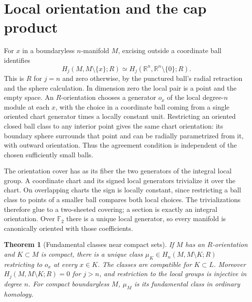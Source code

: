 \documentclass[11pt,oneside,openany]{book}
\theoremstyle{plain}
\newtheorem{theorem}{Theorem}[chapter]
\theoremstyle{definition}
\theoremstyle{remark}
\begin{document}
\section{Local orientation and the cap product}\label{p202:T29}

For \(x\) in a boundaryless \(n\)-manifold \(M\), excising outside
a coordinate ball identifies
\[
 H_j(M,M\setminus\{x\};R)
  \simeq H_j(\mathbb R^n,\mathbb R^n\setminus\{0\};R).
\]
This is \(R\) for \(j=n\) and zero otherwise, by the punctured
ball's radial retraction and the sphere calculation. In dimension
zero the local pair is a point and the empty space.
An \(R\)-orientation chooses a generator \(o_x\) of the local
degree-\(n\) module at each \(x\), with the choice in a coordinate
ball coming from a single oriented chart generator times a
locally constant unit. Restricting an oriented closed ball class
to any interior point gives the same chart orientation: its
boundary sphere surrounds that point and can be radially
parametrized from it, with outward orientation. Thus the
agreement condition is independent of the chosen sufficiently
small balls.

The orientation cover has as its fiber the two generators of the
integral local group. A coordinate chart and its signed local
generators trivialize it over the chart. On overlapping charts
the sign is locally constant, since restricting a ball class to
points of a smaller ball compares both local choices. The
trivializations therefore glue to a two-sheeted covering; a
section is exactly an integral orientation. Over \(\mathbb F_2\)
there is a unique local generator, so every manifold is
canonically oriented with those coefficients.

\begin{theorem}[Fundamental classes near compact sets]\label{thm:p202-compact-orientation}
If \(M\) has an \(R\)-orientation and \(K\subset M\) is compact,
there is a unique class
\(\mu_K\in H_n(M,M\setminus K;R)\) restricting to \(o_x\)
at every \(x\in K\). The classes are compatible for \(K\subset L\).
Moreover \(H_j(M,M\setminus K;R)=0\) for \(j>n\), and
restriction to the local groups is injective in degree \(n\).
For compact boundaryless \(M\), \(\mu_M\) is its fundamental
class in ordinary homology.
\end{theorem}
\end{document}
